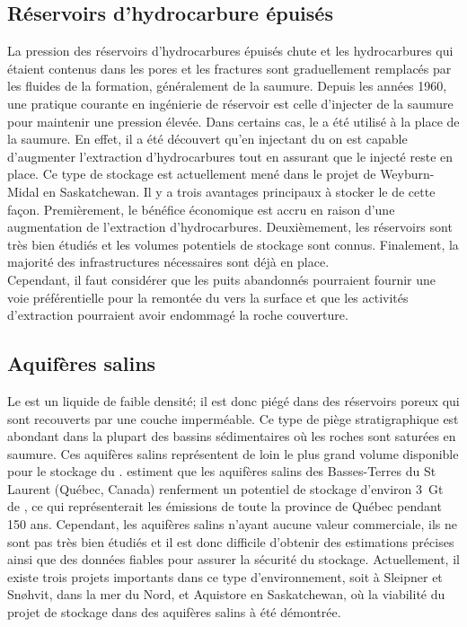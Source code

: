 \subsection{Réservoirs d'hydrocarbure épuisés}
La pression des réservoirs d'hydrocarbures épuisés chute et les hydrocarbures qui étaient contenus dans les pores et les fractures
sont graduellement remplacés par les fluides de la formation, généralement de la saumure.
Depuis les années 1960, une pratique courante en ingénierie de réservoir est
celle d'injecter de la saumure pour maintenir une pression élevée. Dans certains
cas, le  a été utilisé à la place de la saumure. En effet, il a été
découvert qu'en injectant du
 on est capable d’augmenter l'extraction d'hydrocarbures tout en
assurant que le  injecté reste en place. Ce type de stockage est
actuellement mené dans le projet de Weyburn-Midal en Saskatchewan. Il y a trois
avantages principaux à stocker le  de cette façon. Premièrement, le
bénéfice économique est accru en raison d'une augmentation de l'extraction
d'hydrocarbures.
Deuxièmement, les réservoirs sont très bien étudiés et les volumes potentiels de
stockage sont connus. Finalement, la majorité des infrastructures nécessaires
sont déjà en place.\\
Cependant, il faut considérer que les puits abandonnés pourraient fournir une
voie préférentielle pour la remontée du  vers la surface et que les
activités d'extraction pourraient avoir endommagé la roche couverture.
\subsection{Aquifères salins}
Le  est un liquide de faible densité; il est donc piégé dans des
réservoirs poreux qui sont recouverts par une couche imperméable. Ce type de
piège stratigraphique est abondant dans la plupart des bassins sédimentaires
où les roches sont saturées en saumure. Ces aquifères salins représentent de
loin le plus grand volume disponible pour le stockage du .
\citet{Bedard2013} estiment que les aquifères salins des Basses-Terres du
St Laurent (Québec, Canada) renferment un potentiel de stockage d'environ
\SI{3}{\giga\tonne} de , ce qui représenterait les émissions de toute
la
province de Québec pendant \num{150} ans. Cependant, les aquifères salins
n'ayant aucune valeur commerciale, ils ne sont pas très bien étudiés et il est
donc
difficile d'obtenir des estimations précises ainsi que des données fiables pour
assurer la sécurité du stockage. Actuellement, il existe trois projets
importants dans ce type d'environnement, soit à Sleipner et Sn{\o}hvit, dans la
mer du Nord, et Aquistore en Saskatchewan, où la viabilité du projet de stockage
dans des aquifères
salins à été démontrée.
